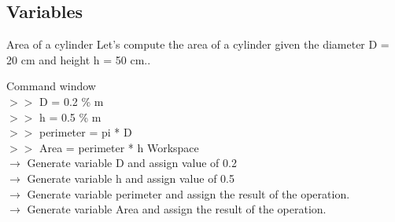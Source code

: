 \documentclass[xcolor={dvipsnames,rgb}, aspectratio=169]{beamer}
\begin{document}
\subsection{Variables}
\begin{frame}{Area of a cylinder}
\large \textcolor{mylilas}{Let's compute the area of a cylinder given the diameter D = 20 cm
and height h = 50 cm.}.

\begin{tcolorbox}[colback=white,colframe=bluepoli,sidebyside]
   \color{mygreen} Command window \color{black}\\
      $>>$ D = 0.2 \color{codegreen} \% m \color{black} \\
      $>>$ h = 0.5 \color{codegreen} \% m \color{black}\\
      $>>$ perimeter = pi * D\\
      $>>$ Area = perimeter * h
   \tcblower
   \color{mygreen} Workspace \color{black} \\
      \small $\rightarrow$ Generate variable D and assign value of 0.2\\
      $\rightarrow$ Generate variable h and assign value of 0.5\\
      $\rightarrow$ Generate variable perimeter and assign the result of the operation.\\
      $\rightarrow$ Generate variable Area and assign the result of the operation.\\
\end{tcolorbox}
\end{frame}
\end{document}
